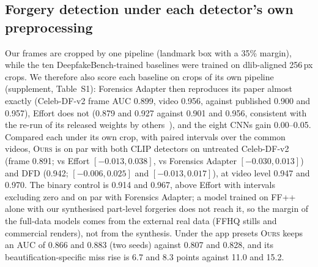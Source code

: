 \documentclass[conference]{IEEEtran}
\newcommand{\ours}{\textsc{Ours}}
\begin{document}
\subsection{Forgery detection under each detector's own preprocessing}
\label{sec:detect}
Our frames are cropped by one pipeline (landmark box with a 35\% margin), while the ten DeepfakeBench-trained baselines
were trained on dlib-aligned 256\,px crops. We therefore also score each baseline on crops of its own pipeline
(supplement, Table~S1): Forensics Adapter then reproduces its paper almost exactly (Celeb-DF-v2 frame AUC 0.899, video
0.956, against published 0.900 and 0.957), Effort does not (0.879 and 0.927 against 0.901 and 0.956, consistent with the
re-run of its released weights by others~\cite{gend2026}), and the eight CNNs gain 0.00--0.05. Compared each under its own
crop, with paired intervals over the common videos, \ours{} is on par with both CLIP detectors on untreated Celeb-DF-v2
(frame 0.891; vs Effort $[-0.013, 0.038]$, vs Forensics Adapter $[-0.030, 0.013]$) and DFD (0.942; $[-0.006, 0.025]$ and
$[-0.013, 0.017]$), at video level 0.947 and 0.970. The binary control is 0.914 and 0.967, above Effort with intervals
excluding zero and on par with Forensics Adapter; a model trained on FF++ alone with our synthesised part-level forgeries
does not reach it, so the margin of the full-data models comes from the external real data (FFHQ stills and commercial
renders), not from the synthesis. Under the app presets \ours{} keeps an AUC of 0.866 and 0.883 (two seeds) against
0.807 and 0.828, and its beautification-specific miss rise is 6.7 and 8.3 points against 11.0 and 15.2.
\end{document}
